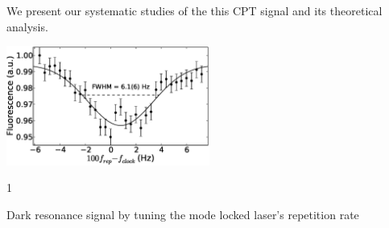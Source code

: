 \documentclass[10pt]{article}
\begin{document}
We present our systematic studies of the this CPT signal and its theoretical analysis.

\begin{center}
  \includegraphics[width=0.5\textwidth]{8700Ne_buffer.eps}
\end{center}

\caption{1}{Dark resonance signal by tuning the mode locked laser's repetition rate}

\end{document}
